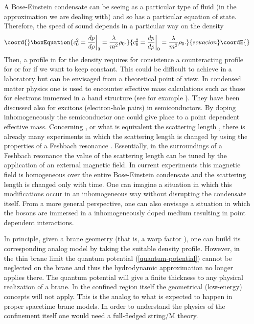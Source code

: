 \documentclass[a4paper,prl,showpacs,twocolumn]{revtex4}
\begin{document}
A Bose-Einstein condensate can be seeing as a particular type of fluid (in the
approximation we are dealing with) and so has a particular equation of
state.  Therefore, the speed of sound depends in a particular way on
the density
%
\begin{equation}\coord{}\boxEquation{
c_0^2={dp \over d \rho}\bigg|_0 = {\lambda \over m^2} \rho_0.
}{
c_0^2={dp \over d \rho}\bigg|_0 = {\lambda \over m^2} \rho_0.
}{ecuacion}\coordE{}\end{equation}
%
Then, a profile in \coordHE{} for the density requires for consistence a
counteracting profile for \myHighlight{$\lambda$}\coordHE{} or for \coordHE{} if we want to keep
\coordHE{}constant. This could be difficult to achieve in a laboratory but
can be envisaged from a theoretical point of view.  In condensed
matter physics one is used to encounter effective mass calculations
such as those for electrons immersed in a band structure (see for
example \cite{ziman}). They have been discussed also for excitons
(electron-hole pairs) in semiconductors.  By doping inhomogeneously
the semiconductor one could give place to a point dependent effective
mass. Concerning \myHighlight{$\lambda$}\coordHE{}, or what is equivalent the scattering
length \coordHE{}, there is already many experiments in which the scattering
length is changed by using the properties of a Feshbach resonance
\cite{feshbach}. Essentially, in the surroundings of a Feshbach
resonance the value of the scattering length can be tuned by the
application of an external magnetic field. In current experiments this
magnetic field is homogeneous over the entire Bose-Einstein condensate
and the scattering length is changed only with time. One can imagine a
situation in which this modifications occur in an inhomogeneous way
without disrupting the condensate itself. From a more general
perspective, one can also envisage a situation in which the bosons
are immersed in a inhomogeneously doped medium resulting in
point dependent interactions. 




In principle, given a brane geometry (that is, a warp factor \coordHE{}), 
one can build 
its corresponding analog model by taking the suitable density profile.
However, in the thin brane limit the quantum potential
(\ref{quantum-potential}) cannot be neglected on the brane and thus
the hydrodynamic approximation no longer applies there.
The quantum potential will give a finite thickness to any physical
realization of a brane. 
In the confined region itself the geometrical (low-energy) concepts 
will not apply. 
This is the analog to what is expected to happen in proper spacetime
brane models. 
In order to understand the physics of the confinement itself one would 
need a full-fledged string/M theory.
\end{document}

